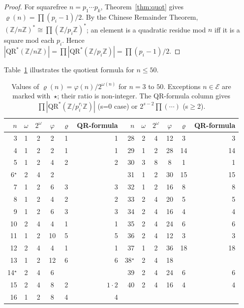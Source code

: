 \documentclass[12pt]{amsart}
\theoremstyle{bluehead}
\theoremstyle{orangehead}
\theoremstyle{greenhead}
\newcommand{\Z}{\mathbb{Z}}
\newcommand{\QRS}{\mathrm{QR}^{*}}
\renewcommand{\phi}{\varphi}
\newcommand{\Exc}{\mathcal{E}}
\begin{document}
\begin{proof}
  For squarefree $n=p_1\cdots p_k$, Theorem~\ref{thm:quot} gives
  $\varrho(n)=\prod(p_i-1)/2$.
  By the Chinese Remainder Theorem,
  $(\Z/n\Z)^*\cong\prod(\Z/p_i\Z)^*$; an element is a quadratic
  residue mod $n$ iff it is a square mod each $p_i$. Hence
  $|\QRS(\Z/n\Z)|=\prod|\QRS(\Z/p_i\Z)|=\prod(p_i-1)/2$.
\qedhere
\end{proof}

Table~\ref{tab:small} illustrates the quotient formula for $n\le50$.

\begin{table}[!ht]
\centering
\small
\caption{Values of $\varrho(n)=\phi(n)/2^{\omega(n)}$ for $n=3$ to $50$.
Exceptions $n\in\Exc$ are marked with~$\star$; their ratio is
non-integer.  The QR-formula column gives $\prod|\QRS(\Z/p_i^{r_i}\Z)|$
(s=0 case) or $2^{s-2}\prod(\cdots)$ (s$\ge$2).}
\label{tab:small}
\setlength{\tabcolsep}{5pt}
\begin{tabular}{@{}rccccr@{\quad}|@{\quad}rccccr@{}}
\toprule
$n$ & $\omega$ & $2^\omega$ & $\phi$ & $\varrho$ & QR-formula
&$n$ & $\omega$ & $2^\omega$ & $\phi$ & $\varrho$ & QR-formula\\
\midrule
 3 & 1 & 2 & 2 & 1 & 1
&28 & 2 & 4 & 12 & 3 & 3 \\
 4 & 1 & 2 & 2 & 1 & 1
&29 & 1 & 2 & 28 & 14 & 14 \\
 5 & 1 & 2 & 4 & 2 & 2
&30 & 3 & 8 & 8 & 1 & 1 \\
{\color{mdred}6}$^\star$  & 2 & 4 & 2 & \color{mdred}{--} &\color{mdred}{E}
&31 & 1 & 2 & 30 & 15 & 15 \\
 7 & 1 & 2 & 6 & 3 & 3
&32 & 1 & 2 & 16 & 8 & 8 \\
 8 & 1 & 2 & 4 & 2 & 2
&33 & 2 & 4 & 20 & 5 & 5 \\
 9 & 1 & 2 & 6 & 3 & 3
&34 & 2 & 4 & 16 & 4 & 4 \\
10 & 2 & 4 & 4 & 1 & 1
&35 & 2 & 4 & 24 & 6 & 6 \\
11 & 1 & 2 & 10 & 5 & 5
&36 & 2 & 4 & 12 & 3 & 3 \\
12 & 2 & 4 & 4 & 1 & 1
&37 & 1 & 2 & 36 & 18 & 18 \\
13 & 1 & 2 & 12 & 6 & 6
&{\color{mdred}38}$^\star$ & 2 & 4 & 18 & \color{mdred}{--} & \color{mdred}{E} \\
{\color{mdred}14}$^\star$ & 2 & 4 & 6 & \color{mdred}{--} & \color{mdred}{E}
&39 & 2 & 4 & 24 & 6 & 6 \\
15 & 2 & 4 & 8 & 2 & $1{\cdot}2$
&40 & 2 & 4 & 16 & 4 & 4 \\
16 & 1 & 2 & 8 & 4 & 4

\end{tabular}
\end{table}
\end{document}
